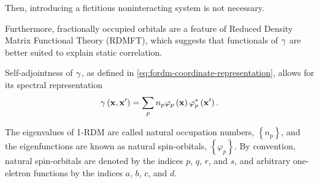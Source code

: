 Then, introducing a fictitious noninteracting system is not necessary.

Furthermore, fractionally occupied orbitals are a feature of Reduced Density 
Matrix Functional Theory (RDMFT), which suggests that functionals of $\gamma$ are 
better suited to explain static correlation.

Self-adjointness of $\gamma$, as defined in \cref{eq:fordm-coordinate-representation},
allows for its spectral representation
\begin{equation}
    \gamma \left( \boldsymbol{\mathrm{x}}, \boldsymbol{\mathrm{x}}^{\prime} \right) =
    \sum_{p} n_p 
    \varphi_p \left( \boldsymbol{\mathrm{x}} \right)
    \varphi_p^{*} \left( \boldsymbol{\mathrm{x}}^{\prime} \right)
    .
\end{equation}

The eigenvalues of 1-RDM are called natural occupation numbers,
$\left\{ n_p \right\}$, and the eigenfunctions are known as natural
spin-orbitals, $\left\{ \varphi_p \right\}$.
By convention, natural spin-orbitals are denoted by the indices $p$, $q$, $r$, and $s$, 
and arbitrary one-eletron functions by the indices $a$, $b$, $c$, and $d$. 

